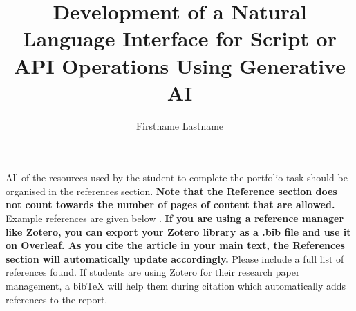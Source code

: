\documentclass[]{reflection}
\title{Development of a Natural Language Interface for Script or API Operations Using Generative AI}
\author{Firstname Lastname
  \institute{RPTU Kaiserslautern, Department of Computer Science}}
\begin{document}

\maketitle






All of the resources used by the student to complete the portfolio task should be organised in the references section. 
\textbf {Note that the Reference section does not count towards the number of pages of content that are allowed.} Example references are given below \cite{einstein}\cite{knuthwebsite}\cite{latexcompanion}. \textbf{ If you are using a reference manager like Zotero, you can export your Zotero library as a .bib file and use it on Overleaf. As you cite the article in your main text, the References section will automatically update accordingly.} Please include a full list of references found. If students are using Zotero for their research paper management, a bibTeX will help them during citation which automatically adds references to the report. 

\medskip




\end{document}
